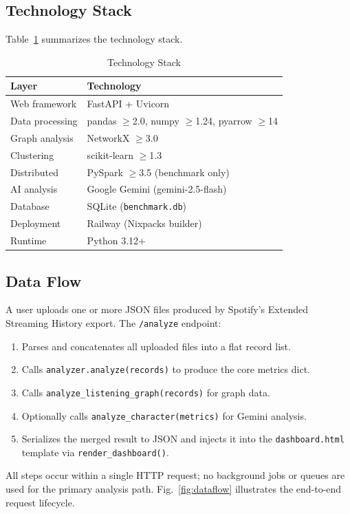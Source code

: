 \documentclass[conference]{IEEEtran}
\begin{document}
\subsection{Technology Stack}

Table~\ref{tab:stack} summarizes the technology stack.

\begin{table}[ht]
\caption{Technology Stack}
\label{tab:stack}
\centering
\begin{tabular}{ll}
\toprule
\textbf{Layer} & \textbf{Technology} \\
\midrule
Web framework  & FastAPI + Uvicorn \\
Data processing & pandas $\geq$2.0, numpy $\geq$1.24, pyarrow $\geq$14 \\
Graph analysis  & NetworkX $\geq$3.0 \\
Clustering      & scikit-learn $\geq$1.3 \\
Distributed     & PySpark $\geq$3.5 (benchmark only) \\
AI analysis     & Google Gemini (gemini-2.5-flash) \\
Database        & SQLite (\texttt{benchmark.db}) \\
Deployment      & Railway (Nixpacks builder) \\
Runtime         & Python 3.12+ \\
\bottomrule
\end{tabular}
\end{table}

\subsection{Data Flow}

A user uploads one or more JSON files produced by Spotify's Extended Streaming
History export. The \texttt{/analyze} endpoint:
\begin{enumerate}
  \item Parses and concatenates all uploaded files into a flat record list.
  \item Calls \texttt{analyzer.analyze(records)} to produce the core metrics
        dict.
  \item Calls \texttt{analyze\_listening\_graph(records)} for graph data.
  \item Optionally calls \texttt{analyze\_character(metrics)} for Gemini
        analysis.
  \item Serializes the merged result to JSON and injects it into the
        \texttt{dashboard.html} template via \texttt{render\_dashboard()}.
\end{enumerate}
All steps occur within a single HTTP request; no background jobs or queues are
used for the primary analysis path. Fig.~\ref{fig:dataflow} illustrates
the end-to-end request lifecycle.
\end{document}
